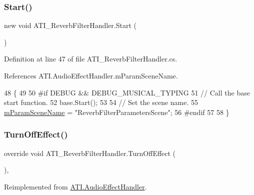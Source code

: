 \subsubsection{\texorpdfstring{Start()}{Start()}}
{\footnotesize\ttfamily new void A\+T\+I\+\_\+\+Reverb\+Filter\+Handler.\+Start (\begin{DoxyParamCaption}{ }\end{DoxyParamCaption})\hspace{0.3cm}{\ttfamily [private]}}



Definition at line 47 of file A\+T\+I\+\_\+\+Reverb\+Filter\+Handler.\+cs.



References A\+T\+I.\+Audio\+Effect\+Handler.\+m\+Param\+Scene\+Name.


\begin{DoxyCode}
48     \{
49 
50 \textcolor{preprocessor}{#if DEBUG && DEBUG\_MUSICAL\_TYPING}
51         \textcolor{comment}{// Call the base start function.}
52         base.Start();
53 
54         \textcolor{comment}{// Set the scene name.}
55         \hyperlink{class_a_t_i_1_1_audio_effect_handler_a674c38f29ef923e6c9487c2dc991a8b6}{mParamSceneName} = \textcolor{stringliteral}{"ReverbFilterParametersScene"};
56 \textcolor{preprocessor}{#endif}
57 
58     \}
\end{DoxyCode}
\mbox{\label{class_a_t_i___reverb_filter_handler_a87b5c207c0ec0422ce8bea66a38334e2}} 
\subsubsection{\texorpdfstring{Turn\+Off\+Effect()}{TurnOffEffect()}}
{\footnotesize\ttfamily override void A\+T\+I\+\_\+\+Reverb\+Filter\+Handler.\+Turn\+Off\+Effect (\begin{DoxyParamCaption}{ }\end{DoxyParamCaption})\hspace{0.3cm}{\ttfamily [protected]}, {\ttfamily [virtual]}}



Reimplemented from \hyperlink{class_a_t_i_1_1_audio_effect_handler_aed35f816dce2a75b857c79ffbb6cc677}{A\+T\+I.\+Audio\+Effect\+Handler}.



